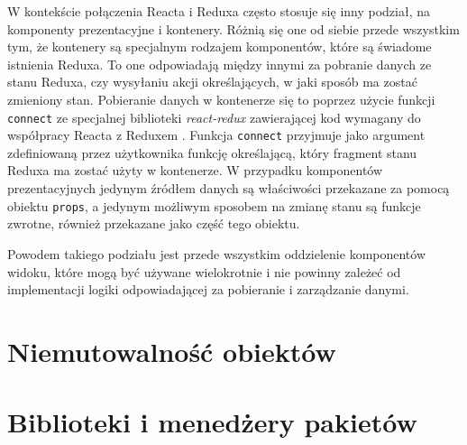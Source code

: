 W kontekście połączenia Reacta i Reduxa często stosuje się inny podział, na komponenty prezentacyjne i kontenery. Różnią się one od siebie przede wszystkim tym, że kontenery są specjalnym rodzajem komponentów, które są świadome istnienia Reduxa. To one odpowiadają między innymi za pobranie danych ze stanu Reduxa, czy wysyłaniu akcji określających, w jaki sposób ma zostać zmieniony stan. Pobieranie danych w kontenerze się to poprzez użycie funkcji \lstinline{connect} ze specjalnej biblioteki \textit{react-redux} zawierającej kod wymagany do współpracy Reacta z Reduxem \cite{reduxDocs}. Funkcja \lstinline{connect} przyjmuje jako argument zdefiniowaną przez użytkownika funkcję określającą, który fragment stanu Reduxa ma zostać użyty w kontenerze. W przypadku komponentów prezentacyjnych jedynym źródłem danych są właściwości przekazane za pomocą obiektu \lstinline{props}, a jedynym możliwym sposobem na zmianę stanu są funkcje zwrotne, również przekazane jako część tego obiektu.

Powodem takiego podziału jest przede wszystkim oddzielenie komponentów widoku, które mogą być używane wielokrotnie i nie powinny zależeć od implementacji logiki odpowiadającej za pobieranie i zarządzanie danymi.

\section{Niemutowalność obiektów}

\section{Biblioteki i menedżery pakietów}
